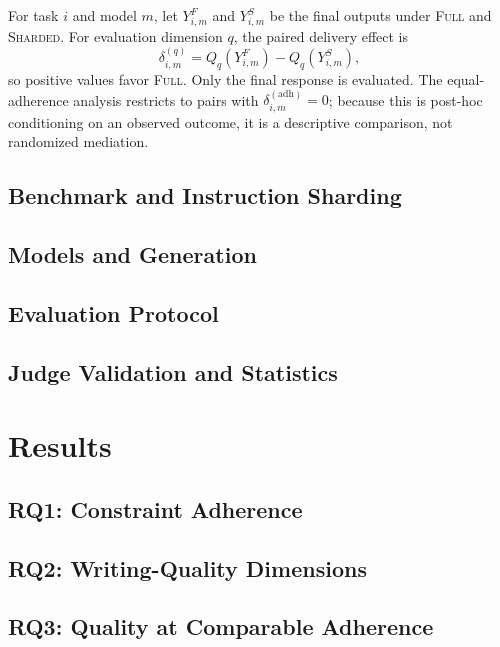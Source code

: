 \documentclass{article}
\begin{document}
For task $i$ and model $m$, let $Y^F_{i,m}$ and $Y^S_{i,m}$ be the final outputs under \textsc{Full} and \textsc{Sharded}. For evaluation dimension $q$, the paired delivery effect is
\begin{equation}
  \delta^{(q)}_{i,m}=Q_q(Y^F_{i,m})-Q_q(Y^S_{i,m}),
  \label{eq:delta}
\end{equation}
so positive values favor \textsc{Full}. Only the final response is evaluated. The equal-adherence analysis restricts to pairs with $\delta^{(\mathrm{adh})}_{i,m}=0$; because this is post-hoc conditioning on an observed outcome, it is a descriptive comparison, not randomized mediation.

\subsection{Benchmark and Instruction Sharding}



\subsection{Models and Generation}


\subsection{Evaluation Protocol}



\subsection{Judge Validation and Statistics}



\section{Results}


\subsection{RQ1: Constraint Adherence}


\subsection{RQ2: Writing-Quality Dimensions}


\subsection{RQ3: Quality at Comparable Adherence}
\end{document}
